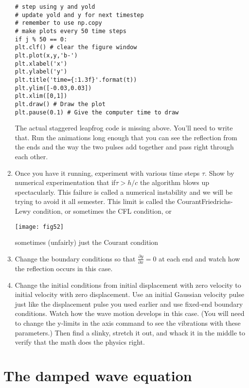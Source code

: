 \begin{problem}
\begin{enumerate}[label=(\alph*)]
\begin{lstlisting}
# step using y and yold
# update yold and y for next timestep
# remember to use np.copy
# make plots every 50 time steps
if j % 50 == 0:
plt.clf() # clear the figure window
plt.plot(x,y,'b-')
plt.xlabel('x')
plt.ylabel('y')
plt.title('time={:1.3f}'.format(t))
plt.ylim([-0.03,0.03])
plt.xlim([0,1])
plt.draw() # Draw the plot
plt.pause(0.1) # Give the computer time to draw
\end{lstlisting}
The actual staggered leapfrog code is missing above. You’ll need to
write that. Run the animations long enough that you can see the
reflection from the ends and the way the two pulses add together and
pass right through each other.
\item Once you have it running, experiment with various time steps $\tau$. Show
by numerical experimentation that if$ \tau > h/c$ the algorithm blows up
spectacularly. This failure is called a numerical instability and we
will be trying to avoid it all semester. This limit is called the CourantFriedrichs-Lewy condition, or sometimes the CFL condition, or 

\texttt{[image: fig52]}\label{fig:26}


sometimes (unfairly) just the Courant condition
\item Change the boundary conditions so that $ \frac{\partial y}{\partial x} = 0 $ at each end and watch
how the reflection occurs in this case.
\item Change the initial conditions from initial displacement with zero
velocity to initial velocity with zero displacement. Use an initial Gaussian velocity pulse just like the displacement pulse you used earlier
and use fixed-end boundary conditions. Watch how the wave motion
develops in this case. (You will need to change the y-limits in the axis
command to see the vibrations with these parameters.) Then find a
slinky, stretch it out, and whack it in the middle to verify that the math
does the physics right.

\end{enumerate}
\end{problem}
\section*{The damped wave equation}

